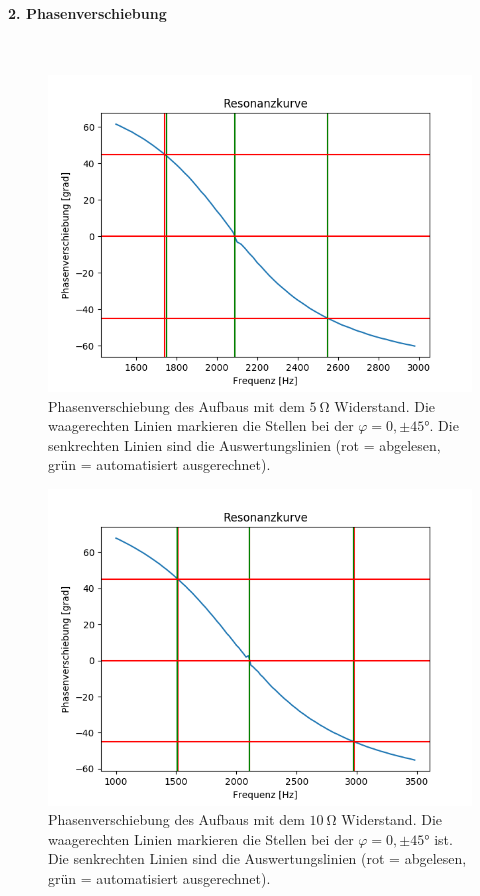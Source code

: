 \documentclass[12pt,a4paper]{article}
\begin{document}
\paragraph{2. Phasenverschiebung}\mbox{}\\
\begin{figure}
\centering
\includegraphics[scale=0.8]{Bilder/Serie_Phasenverschiebung_A_5.png}
\caption{Phasenverschiebung des Aufbaus mit dem $\SI{5}{\ohm}$ Widerstand. Die waagerechten Linien markieren die Stellen bei der $\varphi = 0, \pm \ang{45}$. Die senkrechten Linien sind die Auswertungslinien (rot = abgelesen, grün = automatisiert ausgerechnet).}
\label{fig:Serie_Phasenverschiebung_A_5}
\end{figure}
\begin{figure}
\centering
\includegraphics[scale=0.8]{Bilder/Serie_Phasenverschiebung_A_10.png}
\caption{Phasenverschiebung des Aufbaus mit dem $\SI{10}{\ohm}$ Widerstand. Die waagerechten Linien markieren die Stellen bei der $\varphi = 0, \pm \ang{45}$ ist. Die senkrechten Linien sind die Auswertungslinien (rot = abgelesen, grün = automatisiert ausgerechnet).}
\label{fig:Serie_Phasenverschiebung_A_10}
\end{figure}
\end{document}
